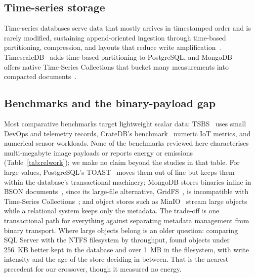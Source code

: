 \documentclass[pdflatex,sn-basic]{sn-jnl}%
\begin{document}
\subsection{Time-series storage}
Time-series databases serve data that mostly arrives in timestamped order and is rarely modified, sustaining append-oriented ingestion through time-based partitioning, compression, and layouts that reduce write amplification~\citep{dewaal_timeseries_survey,jensen_tsms_survey}. TimescaleDB~\citep{timescaledb_official} adds time-based partitioning to PostgreSQL, and MongoDB~\citep{mongodb_official} offers native Time-Series Collections that bucket many measurements into compacted documents~\citep{mongodb_timeseries_collections_guide,mongodb_ts_best_practices}.

\subsection{Benchmarks and the binary-payload gap}\label{subsec:benchmarks}
Most comparative benchmarks target lightweight scalar data: TSBS~\citep{tsbs} uses small DevOps and telemetry records, CrateDB's benchmark~\citep{cratedb_ts_benchmark} numeric IoT metrics, and \citet{diva_timescaledb_mongodb_eval} numerical sensor workloads. None of the benchmarks reviewed here characterises multi-megabyte image payloads or reports energy or emissions (Table~\ref{tab:relwork}); we make no claim beyond the studies in that table. For large values, PostgreSQL's TOAST~\citep{postgresql_toast_docs} moves them out of line but keeps them within the database's transactional machinery; MongoDB stores binaries inline in BSON documents~\citep{mongodb_bson_spec}, since its large-file alternative, GridFS~\citep{mongodb_gridfs}, is incompatible with Time-Series Collections~\citep{mongodb_ts_limitations}; and object stores such as MinIO~\citep{minio_official} stream large objects while a relational system keeps only the metadata. The trade-off is one transactional path for everything against separating metadata management from binary transport. Where large objects belong is an older question: comparing SQL Server with the NTFS filesystem by throughput, \citet{sears_blob_filesystem} found objects under 256~KB better kept in the database and over 1~MB in the filesystem, with write intensity and the age of the store deciding in between. That is the nearest precedent for our crossover, though it measured no energy.
\end{document}
